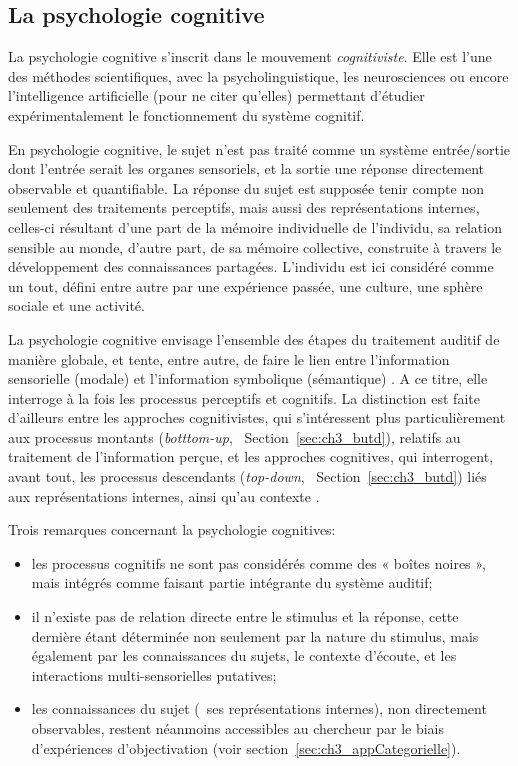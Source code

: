 \subsection{La psychologie cognitive}
\label{sec:ch3_psychoCogDef}

La psychologie cognitive s'inscrit dans le mouvement \emph{cognitiviste}. Elle est l'une des méthodes scientifiques, avec la psycholinguistique, les neurosciences ou encore l'intelligence artificielle (pour ne citer qu'elles) permettant d'étudier expérimentalement le fonctionnement du système cognitif.

En psychologie cognitive, le sujet n'est pas traité comme un système entrée/sortie dont l'entrée serait les organes sensoriels, et la sortie une réponse directement observable et quantifiable. La réponse du sujet est supposée tenir compte non seulement des traitements perceptifs, mais aussi des représentations internes, celles-ci résultant d'une part de la mémoire individuelle de l'individu, sa relation sensible au monde, d'autre part, de sa mémoire collective, construite à travers le développement des connaissances partagées. L'individu est ici considéré comme un tout, défini entre autre par une expérience passée, une culture, une sphère sociale et une activité.

La psychologie cognitive envisage l'ensemble des étapes du traitement auditif de manière globale, et tente, entre autre, de faire le lien entre l'information sensorielle (modale) et l'information symbolique (sémantique) \citep{mcadams1994penser}. A ce titre, elle interroge à la fois les processus perceptifs et cognitifs. La distinction est faite d'ailleurs entre les approches cognitivistes, qui s'intéressent plus particulièrement aux processus montants (\emph{botttom-up}, \cf~Section~\ref{sec:ch3_butd}), relatifs au traitement de l'information perçue, et les approches cognitives, qui interrogent, avant tout, les processus descendants (\emph{top-down}, \cf~Section~\ref{sec:ch3_butd}) liés aux représentations internes, ainsi qu'au contexte \citep[p. 34]{guastavino_etude_2003}. 

Trois remarques concernant la psychologie cognitives:

\begin{itemize}
\item les processus cognitifs ne sont pas considérés comme des « boîtes noires », mais intégrés comme faisant partie intégrante du système auditif;
\item il n'existe pas de relation directe entre le stimulus et la réponse, cette dernière étant déterminée non seulement par la nature du stimulus, mais également par les connaissances du sujets, le contexte d'écoute, et les interactions multi-sensorielles putatives;
\item les connaissances du sujet (\ie~ses représentations internes), non directement observables, restent néanmoins accessibles au chercheur par le biais d'expériences d'objectivation (voir section~\ref{sec:ch3_appCategorielle}).
\end{itemize}

